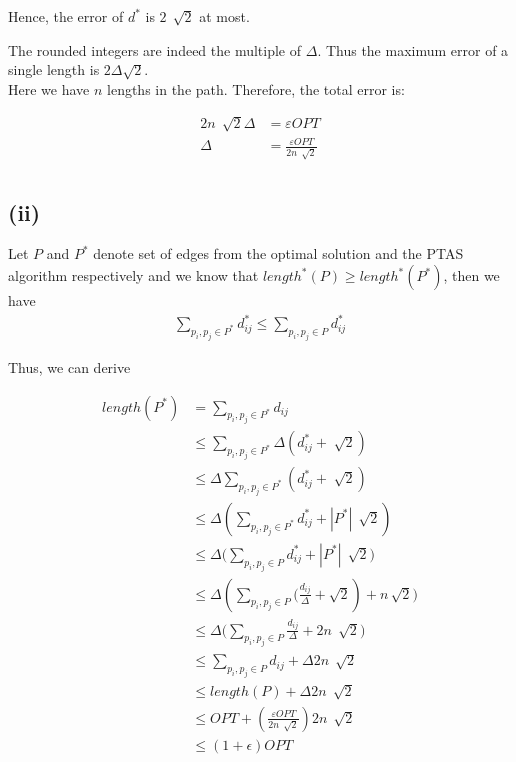 
Hence, the error of $d^*$  is $2\,\sqrt[]{2}$ at most.

The rounded integers are indeed the multiple of $\Delta$. Thus the maximum error of a single length is $2\Delta\sqrt{2}$. \\

Here we have $n$ lengths in the path. Therefore, the total error is:

\begin{align*}
    2n\,\sqrt[]{2}\Delta &= \varepsilon OPT\\
    \Delta &= \frac{\varepsilon OPT}{2n\,\sqrt[]{2}}\\
\end{align*}

\subsection*{(ii)}

Let $P$ and $P^*$ denote set of edges from the optimal solution and the PTAS algorithm respectively and we know that $length^*(P) \geq length^*(P^*)$, then we have
\begin{align*}
	\sum_{p_{i},p_{j} \in P^*}{d^*_{ij}} \leq \sum_{p_{i},p_{j} \in P}{d^*_{ij}}
\end{align*}

Thus, we can derive

\begin{align*}
	length(P^*) &= \sum_{p_{i},p_{j} \in P^*}{d_{ij}} \\
	&\leq \sum_{p_{i},p_{j} \in  P^*}{\Delta(d^*_{ij}+\sqrt[]{2})}  \\
	&\leq \Delta \sum_{p_{i},p_{j} \in  P^*}{(d^*_{ij}+\sqrt[]{2})} \\
	&\leq \Delta ( \sum_{p_{i},p_{j} \in  P^*}{d^*_{ij}}+|P^*|\,\sqrt[]{2}) \\
    &\leq \Delta ( \sum_{p_{i},p_{j} \in  P}{d^*_{ij}+|P^*|\,\sqrt[]{2})} \\
    &\leq \Delta ( \sum_{p_{i},p_{j} \in  P}{( \frac{ d_{ij} }{ \Delta} + \sqrt{2} } ) + n\,\sqrt{2} ) \\
    &\leq \Delta ( \sum_{p_{i},p_{j} \in  P}{\frac{d_{ij}}{\Delta}+2n\,\sqrt[]{2})} \\
    &\leq \sum_{p_{i},p_{j} \in  P}{d_{ij}} + \Delta 2 n \,\sqrt[]{2} \\
    &\leq length\left(P\right) + \Delta2n\,\sqrt[]{2} \\
    &\leq OPT + \left( \frac{\varepsilon OPT}{2n\,\sqrt[]{2}} \right) 2n\,\sqrt[]{2} \\
    &\leq (1 + \epsilon )OPT
\end{align*}


